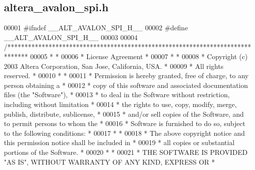 \subsection{altera\+\_\+avalon\+\_\+spi.\+h}
\label{altera__avalon__spi_8h_source}

\begin{DoxyCode}
00001 \textcolor{preprocessor}{#ifndef \_\_ALT\_AVALON\_SPI\_H\_\_}
00002 \textcolor{preprocessor}{#define \_\_ALT\_AVALON\_SPI\_H\_\_}
00003 
00004 \textcolor{comment}{/******************************************************************************}
00005 \textcolor{comment}{*                                                                             *}
00006 \textcolor{comment}{* License Agreement                                                           *}
00007 \textcolor{comment}{*                                                                             *}
00008 \textcolor{comment}{* Copyright (c) 2003 Altera Corporation, San Jose, California, USA.           *}
00009 \textcolor{comment}{* All rights reserved.                                                        *}
00010 \textcolor{comment}{*                                                                             *}
00011 \textcolor{comment}{* Permission is hereby granted, free of charge, to any person obtaining a     *}
00012 \textcolor{comment}{* copy of this software and associated documentation files (the "Software"),  *}
00013 \textcolor{comment}{* to deal in the Software without restriction, including without limitation   *}
00014 \textcolor{comment}{* the rights to use, copy, modify, merge, publish, distribute, sublicense,    *}
00015 \textcolor{comment}{* and/or sell copies of the Software, and to permit persons to whom the       *}
00016 \textcolor{comment}{* Software is furnished to do so, subject to the following conditions:        *}
00017 \textcolor{comment}{*                                                                             *}
00018 \textcolor{comment}{* The above copyright notice and this permission notice shall be included in  *}
00019 \textcolor{comment}{* all copies or substantial portions of the Software.                         *}
00020 \textcolor{comment}{*                                                                             *}
00021 \textcolor{comment}{* THE SOFTWARE IS PROVIDED "AS IS", WITHOUT WARRANTY OF ANY KIND, EXPRESS OR  *}

\end{DoxyCode}
